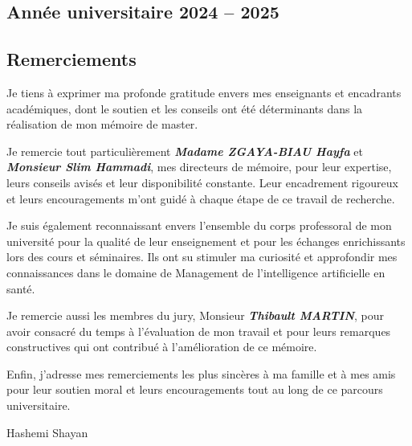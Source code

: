 \documentclass[
]{article}
\begin{document}
\hypertarget{annuxe9e-universitaire-2024-2025}{%
\subsection{Année universitaire 2024 -- 2025}\label{annuxe9e-universitaire-2024-2025}}

\hypertarget{section-19}{%
\subsection{}\label{section-19}}

\hypertarget{remerciements}{%
\subsection{Remerciements}\label{remerciements}}

Je tiens à exprimer ma profonde gratitude envers mes enseignants et encadrants académiques, dont le soutien et les conseils ont été déterminants dans la réalisation de mon mémoire de master.

Je remercie tout particulièrement \emph{\textbf{Madame ZGAYA-BIAU Hayfa}} et \emph{\textbf{Monsieur Slim Hammadi}}, mes directeurs de mémoire, pour leur expertise, leurs conseils avisés et leur disponibilité constante. Leur encadrement rigoureux et leurs encouragements m'ont guidé à chaque étape de ce travail de recherche.

Je suis également reconnaissant envers l'ensemble du corps professoral de mon université pour la qualité de leur enseignement et pour les échanges enrichissants lors des cours et séminaires. Ils ont su stimuler ma curiosité et approfondir mes connaissances dans le domaine de Management de l'intelligence artificielle en santé.

Je remercie aussi les membres du jury, Monsieur \emph{\textbf{Thibault MARTIN}}, pour avoir consacré du temps à l'évaluation de mon travail et pour leurs remarques constructives qui ont contribué à l'amélioration de ce mémoire.

Enfin, j'adresse mes remerciements les plus sincères à ma famille et à mes amis pour leur soutien moral et leurs encouragements tout au long de ce parcours universitaire.

Hashemi Shayan

\hypertarget{section-20}{%
\subsection{}\label{section-20}}
\end{document}
